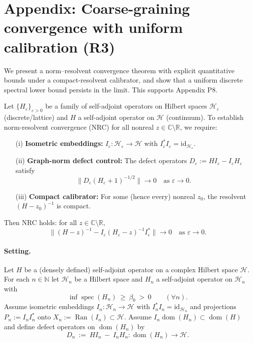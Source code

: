 \documentclass[11pt]{amsart}
\begin{document}
\section{Appendix: Coarse-graining convergence with uniform calibration (R3)}

We present a norm–resolvent convergence theorem with explicit quantitative bounds under a compact-resolvent calibrator, and show that a uniform discrete spectral lower bound persists in the limit. This supports Appendix P8.

\begin{theorem}\label{thm:nrc-framework}
Let $\{H_\varepsilon\}_{\varepsilon > 0}$ be a family of self-adjoint operators on Hilbert spaces $\mathcal{H}_\varepsilon$ (discrete/lattice) and $H$ a self-adjoint operator on $\mathcal{H}$ (continuum). To establish norm-resolvent convergence (NRC) for all nonreal $z \in \mathbb{C} \setminus \mathbb{R}$, we require:
\begin{itemize}
  \item[(i)] \textbf{Isometric embeddings:} $I_\varepsilon: \mathcal{H}_\varepsilon \to \mathcal{H}$ with $I_\varepsilon^* I_\varepsilon = \mathrm{id}_{\mathcal{H}_\varepsilon}$.
  \item[(ii)] \textbf{Graph-norm defect control:} The defect operators $D_\varepsilon := H I_\varepsilon - I_\varepsilon H_\varepsilon$ satisfy
  \[
    \|D_\varepsilon (H_\varepsilon + 1)^{-1/2}\| \to 0 \quad \text{as } \varepsilon \to 0.
  \]
  \item[(iii)] \textbf{Compact calibrator:} For some (hence every) nonreal $z_0$, the resolvent $(H - z_0)^{-1}$ is compact.
\end{itemize}
Then NRC holds: for all $z \in \mathbb{C} \setminus \mathbb{R}$,
\[
  \|(H - z)^{-1} - I_\varepsilon (H_\varepsilon - z)^{-1} I_\varepsilon^*\| \to 0 \quad \text{as } \varepsilon \to 0.
\]
\end{theorem}

\paragraph{Setting.}
Let $H$ be a (densely defined) self-adjoint operator on a complex Hilbert space $\mathcal H$. For each $n\in\mathbb N$ let $\mathcal H_n$ be a Hilbert space and $H_n$ a self-adjoint operator on $\mathcal H_n$ with
\[
  \inf\operatorname{spec}(H_n)\ \ge\ \beta_0\ >\ 0\qquad(\forall n).
\]
Assume isometric embeddings $I_n:\mathcal H_n\to\mathcal H$ with $I_n^*I_n=\mathrm{id}_{\mathcal H_n}$ and projections $P_n:=I_n I_n^*$ onto $X_n:=\operatorname{Ran}(I_n)\subset\mathcal H$. Assume $I_n\operatorname{dom}(H_n)\subset\operatorname{dom}(H)$ and define defect operators on $\operatorname{dom}(H_n)$ by
\[
  D_n\ :=\ H I_n\ -\ I_n H_n: \operatorname{dom}(H_n)\to\mathcal H.
\]
\end{document}
